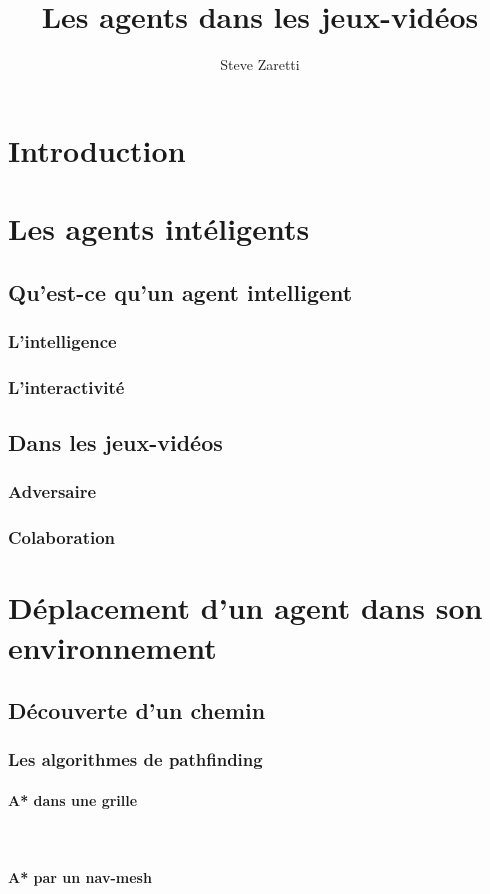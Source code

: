 \documentclass[hidelinks,a4paper, 12pt]{article}
\title{Les agents dans les jeux-vidéos}
\author{Steve Zaretti}
\newcommand{\subsubsubsection}[1]{\paragraph{#1}\mbox{}\\}
\begin{document}
    \maketitle
	\newpage
	\tableofcontents
	\newpage
	
    \section{Introduction}

    \section{Les agents intéligents}
    \subsection{Qu'est-ce qu'un agent intelligent}
    \subsubsection{L'intelligence}
    \subsubsection{L'interactivité}
    \subsection{Dans les jeux-vidéos}
    \subsubsection{Adversaire}
    \subsubsection{Colaboration}

    \section{Déplacement d'un agent dans son environnement}
    \subsection{Découverte d'un chemin}
    \subsubsection{Les algorithmes de pathfinding}
    \subsubsubsection{A* dans une grille}
    \subsubsubsection{A* par un nav-mesh}
\end{document}
